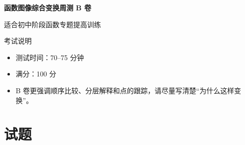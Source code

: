 \documentclass[11pt,a4paper,fontset=fandol]{ctexart}
\begin{document}
\thispagestyle{empty}
\begin{center}
{\fontsize{22}{28}\selectfont\bfseries 函数图像综合变换周测 B 卷\par}
\vspace{0.4cm}
{\large 适合初中阶段函数专题提高训练\par}
\end{center}

\begin{infobox}{考试说明}
\begin{itemize}
  \item 测试时间：70--75 分钟
  \item 满分：100 分
  \item B 卷更强调顺序比较、分层解释和点的跟踪，请尽量写清楚“为什么这样变换”。
\end{itemize}
\end{infobox}

\section{试题}
\end{document}
